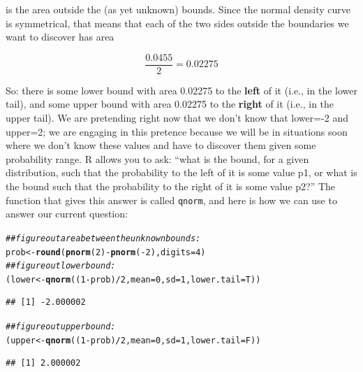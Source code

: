 \documentclass[12pt]{book}\usepackage[]{graphicx}\usepackage[]{color}
\makeatletter
\newcommand{\hlnum}[1]{\textcolor[rgb]{0.686,0.059,0.569}{#1}}%
\newcommand{\hlcom}[1]{\textcolor[rgb]{0.678,0.584,0.686}{\textit{#1}}}%
\newcommand{\hlopt}[1]{\textcolor[rgb]{0,0,0}{#1}}%
\newcommand{\hlstd}[1]{\textcolor[rgb]{0.345,0.345,0.345}{#1}}%
\newcommand{\hlkwb}[1]{\textcolor[rgb]{0.69,0.353,0.396}{#1}}%
\newcommand{\hlkwc}[1]{\textcolor[rgb]{0.333,0.667,0.333}{#1}}%
\newcommand{\hlkwd}[1]{\textcolor[rgb]{0.737,0.353,0.396}{\textbf{#1}}}%
\newenvironment{kframe}{%
 \def\at@end@of@kframe{}%
 \ifinner\ifhmode%
  \def\at@end@of@kframe{\end{minipage}}%
  \begin{minipage}{\columnwidth}%
 \fi\fi%
 \def\FrameCommand##1{\hskip\@totalleftmargin \hskip-\fboxsep
 \colorbox{shadecolor}{##1}\hskip-\fboxsep
     \hskip-\linewidth \hskip-\@totalleftmargin \hskip\columnwidth}%
 \MakeFramed {\advance\hsize-\width
   \@totalleftmargin\z@ \linewidth\hsize
   \@setminipage}}%
 {\par\unskip\endMakeFramed%
 \at@end@of@kframe}
\newenvironment{knitrout}{}{} %
\makeatother
\begin{document}
\noindent 
is the area outside the (as yet unknown) bounds. Since the normal density curve is symmetrical, that means that each of the two sides outside the boundaries we want to discover has area 

\begin{equation}
\frac{0.0455}{2}=0.02275
\end{equation}

So: there is some lower bound with area 0.02275 to the \textbf{left} of it (i.e., in the lower tail), and some upper bound with area 0.02275 to the \textbf{right} of it (i.e., in the upper tail). We are pretending right now that we don't know that lower=-2 and upper=2; we are engaging in this pretence because we will be in situations soon where we don't know these values and have to discover them given some probability range. R allows you to ask: ``what is the bound, for a given distribution, such that the probability to the left of it is some value p1, or what is the bound such that the probability to the right of it is some value p2?'' 
The function that gives this answer is called \texttt{qnorm}, and here is how we can use to answer our current question:

\begin{knitrout}
\color{fgcolor}\begin{kframe}
\begin{alltt}
\hlcom{## figure out area between the unknown bounds:}
\hlstd{prob}\hlkwb{<-}\hlkwd{round}\hlstd{(}\hlkwd{pnorm}\hlstd{(}\hlnum{2}\hlstd{)}\hlopt{-}\hlkwd{pnorm}\hlstd{(}\hlopt{-}\hlnum{2}\hlstd{),}\hlkwc{digits}\hlstd{=}\hlnum{4}\hlstd{)}
\hlcom{## figure out lower bound:}
\hlstd{(lower}\hlkwb{<-}\hlkwd{qnorm}\hlstd{((}\hlnum{1}\hlopt{-}\hlstd{prob)}\hlopt{/}\hlnum{2}\hlstd{,}\hlkwc{mean}\hlstd{=}\hlnum{0}\hlstd{,}\hlkwc{sd}\hlstd{=}\hlnum{1}\hlstd{,}\hlkwc{lower.tail}\hlstd{=T))}
\end{alltt}
\begin{verbatim}
## [1] -2.000002
\end{verbatim}
\begin{alltt}
\hlcom{## figure out upper bound:}
\hlstd{(upper}\hlkwb{<-}\hlkwd{qnorm}\hlstd{((}\hlnum{1}\hlopt{-}\hlstd{prob)}\hlopt{/}\hlnum{2}\hlstd{,}\hlkwc{mean}\hlstd{=}\hlnum{0}\hlstd{,}\hlkwc{sd}\hlstd{=}\hlnum{1}\hlstd{,}\hlkwc{lower.tail}\hlstd{=F))}
\end{alltt}
\begin{verbatim}
## [1] 2.000002
\end{verbatim}
\end{kframe}
\end{knitrout}
\end{document}
